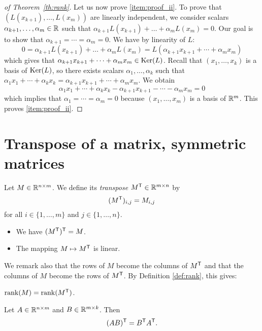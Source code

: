 \documentclass[11pt,nocut]{article}
\begin{document}
\begin{proof}[of Theorem~\ref{th:rank}]
Let us now prove \ref{item:proof_ii}. To prove that $(L(x_{k+1}), \dots, L(x_m))$ are linearly independent, we consider scalars $\alpha_{k+1}, \dots, \alpha_m \in \mathbb{R}$ such that $\alpha_{k+1} L(x_{k+1}) + \dots + \alpha_m L(x_m) =0$. Our goal is to show that $\alpha_{k+1} = \cdots = \alpha_m = 0$. We have by linearity of $L$:
$$
0 =\alpha_{k+1} L(x_{k+1}) + \dots + \alpha_m L(x_m) = L(\alpha_{k+1} x_{k+1} + \cdots + \alpha_m x_m)
$$
which gives that $\alpha_{k+1} x_{k+1} + \cdots + \alpha_m x_m \in {{\rm Ker}}(L)$. Recall that $(x_1, \dots, x_k)$ is a basis of ${{\rm Ker}}(L)$, so there exists scalars $\alpha_1, \dots, \alpha_k$ such that $\alpha_1 x_1 + \cdots + \alpha_k x_k = \alpha_{k+1} x_{k+1} + \cdots + \alpha_m x_m$. We obtain
$$
\alpha_1 x_1 + \cdots + \alpha_k x_k - \alpha_{k+1} x_{k+1} - \cdots - \alpha_m x_m = 0
$$
which implies that $\alpha_1 = \cdots = \alpha_m = 0$ because $(x_1, \dots, x_m)$ is a basis of $\mathbb{R}^m$. This proves \ref{item:proof_ii}.
\end{proof}

\section{Transpose of a matrix, symmetric matrices}

\begin{definition}[Transpose]
	Let $M \in \mathbb{R}^{n \times m}$. We define its \emph{transpose} $M^{{\sf T}} \in \mathbb{R}^{m \times n}$ by
	$$
	(M^{{\sf T}})_{i,j} = M_{i,j}
	$$
	for all $i \in \{1, \dots, m\}$ and $j \in \{1, \dots, n\}$.
\end{definition}

\begin{remark}
	\leavevmode
	\begin{itemize}
		\item We have $(M^{{\sf T}})^{{\sf T}} = M$. 
		\item The mapping $M \mapsto M^{{\sf T}}$ is linear.
	\end{itemize}
\end{remark}

We remark also that the rows of $M$ become the columns of $M^{{\sf T}}$ and that the columns of $M$ become the rows of $M^{{\sf T}}$. By Definition \ref{def:rank}, this gives:
\begin{proposition}
	${{\rm rank}}(M) = {{\rm rank}}(M^{{\sf T}})$.
\end{proposition}

\begin{proposition}\label{prop:transpose_product}
	Let $A \in \mathbb{R}^{n \times m}$ and $B \in \mathbb{R}^{m \times k}$. Then
	$$
	(AB)^{{\sf T}} = B^{{\sf T}} A^{{\sf T}}.
	$$
\end{proposition}
\end{document}
